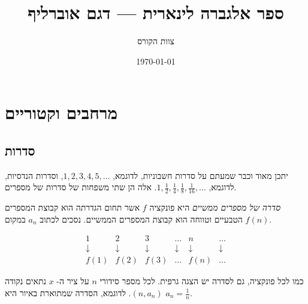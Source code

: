 \documentclass[12pt]{book}
\title{ספר אלגברה לינארית — דגם אוברליף}
\author{צוות הקורס}
\date{\today}
\theoremstyle{plain}
\theoremstyle{definition}
\begin{document}
\frontmatter
\maketitle
\tableofcontents
\mainmatter

\chapter{מרחבים וקטוריים}
\section{סדרות}

יתכן מאוד וכבר שמעתם על סדרות חשבוניות,
לדוגמא,
$1,2,3,4,5,\ldots$, 
וסדרות הנדסיות, 
לדוגמא, 
$1,\frac{1}{2},\frac{1}{4},\frac{1}{8},\frac{1}{16},\ldots$. 
אלה הן שתי משפחות של סדרות של מספרים. 
\begin{defnH}
{\it סדרה של מספרים ממשיים} 
היא פונקציה 
$f$ 
אשר תחום הגדרתה הוא קבוצת המספרים הטבעיים וטווחה הוא קבוצת המספרים הממשיים. 
נסכים לכתוב 
$a_n$ 
במקום 
$f(n)$.
\end{defnH}
\[
\begin{array}{cccccc}
1 & 2 & 3 & \ldots & n & \ldots \\
\downarrow & \downarrow & \downarrow & \downarrow & \downarrow & \downarrow \\
f(1) & f(2) & f(3) & \ldots & f(n) & \ldots
\end{array}
\]


כמו לכל פונקציה, גם לסדרה יש הצגה גרפית. לכל מספר סידורי 
$n$ 
על ציר ה- 
$x$ 
נתאים 
נקודה 
$(n,a_n)$. 
לדוגמא, הסדרה שמתוארת באיור היא 
$a_n=\frac{1}{n}$. 


\vspace{1cm}

\begin{center}
\end{center}
\end{document}
